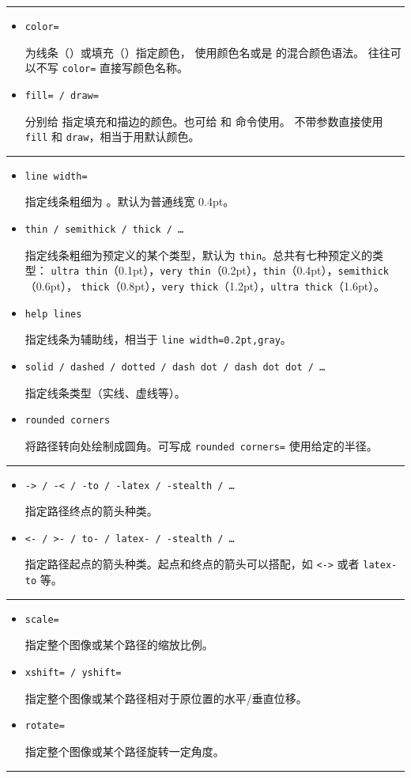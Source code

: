\begin{table}[htp]
\caption{\TikZ\ 常用的一些绘图参数。}\label{tbl:tikz-options}
\small
\hrule
\begin{itemize}
  \item \texttt{color=} \par
  为线条（）或填充（）指定颜色， 使用颜色名或是  的混合颜色语法。
  往往可以不写 \texttt{color=} 直接写颜色名称。
  \item \texttt{fill= / draw=} \par
  分别给  指定填充和描边的颜色。也可给  和  命令使用。
  不带参数直接使用 \texttt{fill} 和 \texttt{draw}，相当于用默认颜色。
\end{itemize}
\hrule
\begin{itemize}
  \item \texttt{line width=} \par
  指定线条粗细为 。默认为普通线宽 0.4pt。
  \item \texttt{thin / semithick / thick / \ldots} \par
  指定线条粗细为预定义的某个类型，默认为 \texttt{thin}。总共有七种预定义的类型：
  \texttt{ultra thin}（0.1pt），\texttt{very thin}（0.2pt），\texttt{thin}（0.4pt），\texttt{semithick}（0.6pt），
  \texttt{thick}（0.8pt），\texttt{very thick}（1.2pt），\texttt{ultra thick}（1.6pt）。
  \item \texttt{help lines} \par
  指定线条为辅助线，相当于 \texttt{line width=0.2pt,gray}。
  \item \texttt{solid / dashed / dotted / dash dot / dash dot dot / \dots} \par
  指定线条类型（实线、虚线等）。
  \item \texttt{rounded corners} \par
  将路径转向处绘制成圆角。可写成 \texttt{rounded corners=} 使用给定的半径。
\end{itemize}
\hrule
\begin{itemize}
  \item \texttt{-> / -< / -to / -latex / -stealth / \ldots} \par
  指定路径终点的箭头种类。
  \item \texttt{<- / >- / to- / latex- / -stealth / \ldots} \par
  指定路径起点的箭头种类。起点和终点的箭头可以搭配，如 \texttt{<->} 或者 \texttt{latex-to} 等。
\end{itemize}
\hrule
\begin{itemize}
  \item \texttt{scale=} \par
  指定整个图像或某个路径的缩放比例。
  \item \texttt{xshift= / yshift=} \par
  指定整个图像或某个路径相对于原位置的水平/垂直位移。
  \item \texttt{rotate=} \par
  指定整个图像或某个路径旋转一定角度。
\end{itemize}
\hrule
\end{table}

